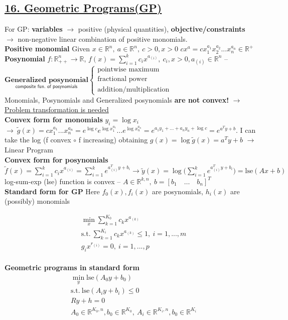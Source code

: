 \documentclass[a4paper]{article}
\begin{document}
\subsection*{\underline{16. Geometric Programs(GP)}}
For GP: \textbf{variables} $\to$ positive (physical quantities), \textbf{objective/constraints} $\to$ non-negative linear combination of positive monomials.\\
\textbf{Positive monomial} Given $x\in\mathbb{R}^n,\ a \in \mathbb{R}^n, \ c>0, x>0$ $cx^a=cx_1^{a_1}x_2^{a_2}...x_n^{a_n}\in\mathbb{R}^+$\\
\textbf{Posynomial} $f:\mathbb{R}^n_{++}\to\mathbb{R}$, $f(x)=\sum_{i=1}^{k}{c_i x^{a_{(i)}}}, \ c_i, x>0, a_{(i)}\in\mathbb{R}^n$ -- $\underset{\textsf{composite fun. of posynomials}}{\textbf{Generalized posynomial}} \begin{cases}
    \text{pointwise maximum}\\
    \text{fractional power}\\
    \text{addition/multiplication}
\end{cases}$\\
Monomials, Posynomials and Generalized posynomials \textbf{are not convex!} $\to$ \underline{Problem transformation is needed}\\
\textbf{Convex form for monomials} $y_i=\log x_i$ $\to \ \tilde{g}(x)=cx_1^{a_1}...x_n^{a_n}=e^{\log c}e^{\log{x_1^{a_1}}}...e^{\log{x_n^{a_n}}}=e^{a_1{y_1}+...+a_n{y_n}+\log{c}}=e^{a^T{y}+b}$. I can take the log (f convex $\circ$ f increasing) obtaining $g(x)=\log{\tilde{g}(x)}=a^T{y}+b$ $\to$ Linear Program\\
\textbf{Convex form for posynomials} $\tilde{f}(x)=\sum_{i=1}^{k}{c_i{x}^{a_{(i)}}}=\sum_{i=1}^{k}{e^{a_{(i)}^T{y}+b_i}}\to
\tilde{y}(x)=\log\bigg({\sum_{i=1}^{k}{e^{a_{(i)}^T{y}+b_i}}}\bigg)=\text{lse}(Ax+b)$\\
log-sum-exp (lse) function is convex -- $A\in\mathbb{R}^{k,n}, \ b = [b_1 \quad \dots \quad b_n]^T$\\
\newpage
\textbf{Standard form for GP} Here $f_0(x), f_i(x)$ are posynomials, $h_i(x)$ are (possibly) monomials
\vspace{-0.3cm}
\begin{multicols}{2}
    \begin{align*}
        &\min_{x} {\sum_{k=1}^{K_0}{c_k{x^{a_{(k)}}}}}\\
        &\text{s.t.} \ \sum_{k=1}^{K_i}{c_k}x^{a_{(k)}} \le 1, \ i=1,...,m\\
        &g_i{x^{r_{(i)}}}=0, \ i=1,...,p
    \end{align*}
    \newcolumn\\
    \textbf{Geometric programs in standard form}
    \begin{align*}
        &\min_{y} \text{lse}(A_0y+b_0)\\
        &\text{s.t.} \ \text{lse}(A_i{y}+b_i)\le0\\
        &Ry+h=0\\
        &A_0\in\mathbb{R}^{K_0,n}, b_0 \in \mathbb{R}^{K_0}, \ A_i\in\mathbb{R}^{K_i,n}, b_0 \in \mathbb{R}^{K_i}
    \end{align*}
\end{multicols}
\end{document}
